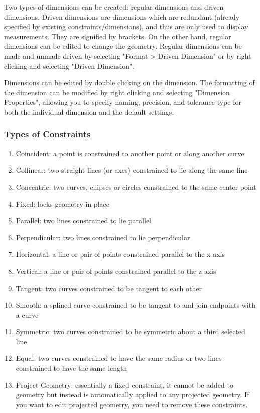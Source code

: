 Two types of dimensions can be created: regular dimensions and driven dimensions. Driven dimensions are dimensions which are redundant (already specified by existing constraints/dimensions), and thus are only used to display measurements. They are signified by brackets. On the other hand, regular dimensions can be edited to change the geometry. Regular dimensions can be made and unmade driven by selecting "Format > Driven Dimension" or by right clicking and selecting "Driven Dimension".

Dimensions can be edited by double clicking on the dimension. The formatting of the dimension can be modified by right clicking and selecting "Dimension Properties", allowing you to specify naming, precision, and tolerance type for both the individual dimension and the default settings.


\subsubsection{Types of Constraints}

\begin{enumerate}
\item Coincident: a point is constrained to another point or along another curve
\item Collinear: two straight lines (or axes) constrained to lie along the same line
\item Concentric: two curves, ellipses or circles constrained to the same center point
\item Fixed: locks geometry in place
\item Parallel: two lines constrained to lie parallel
\item Perpendicular: two lines constrained to lie perpendicular
\item Horizontal: a line or pair of points constrained parallel to the x axis
\item Vertical: a line or pair of points constrained parallel to the z axis
\item Tangent: two curves constrained to be tangent to each other
\item Smooth: a splined curve constrained to be tangent to and join endpoints with a curve
\item Symmetric: two curves constrained to be symmetric about a third selected line
\item Equal: two curves constrained to have the same radius or two lines constrained to have the same length
\item Project Geometry: essentially a fixed constraint, it cannot be added to geometry but instead is automatically applied to any projected geometry. If you want to edit projected geometry, you need to remove these constraints.
\end{enumerate}

